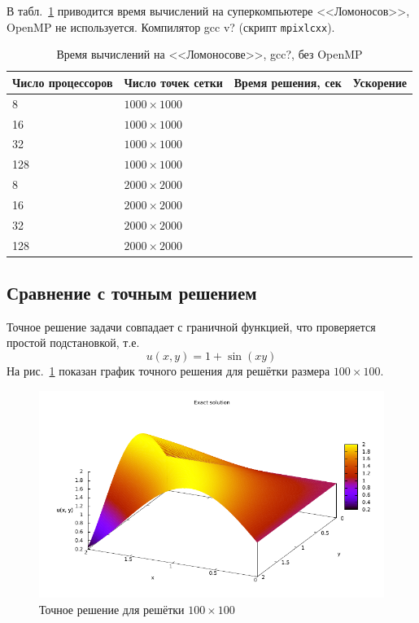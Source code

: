 \documentclass[12pt,notitlepage,oneside]{extarticle}
\begin{document}
В табл.~\ref{lom:table} приводится время вычислений на суперкомпьютере
<<Ломоносов>>, OpenMP не используется. Компилятор gcc v?
(скрипт \texttt{mpixlcxx}).

\begin{table}[h]
\centering
\caption{Время вычислений на <<Ломоносове>>, gcc?, без OpenMP}
\label{lom:table}
\begin{tabular}{|l|l|l|l|}
\textbf{Число процессоров} & \textbf{Число точек сетки} & \textbf{Время решения, сек} & \textbf{Ускорение} \\ \hline
8                          & $1000 \times 1000 $        &                        &                    \\
16                         & $1000 \times 1000 $        &                        &                    \\
32                         & $1000 \times 1000 $        &                        &                    \\
128                        & $1000 \times 1000 $        &                        &                    \\ \hline
8                          & $2000 \times 2000 $        &                        &                    \\
16                         & $2000 \times 2000 $        &                        &                    \\
32                         & $2000 \times 2000 $        &                        &                    \\
128                        & $2000 \times 2000 $        &                        &                    \\
\end{tabular}
\end{table}

\subsection{Сравнение с точным решением}
Точное решение задачи совпадает с граничной функцией, что проверяется простой
подстановкой, т.е.
\[
  u(x, y) = 1 + \sin(xy)
\]
На рис.~\ref{exact:image} показан график точного решения для решётки размера
$100 \times 100$.

\begin{figure}[h]
  \centering
  \includegraphics[scale=1.3]{correct_sol.pdf}
  \caption{Точное решение для решётки $100 \times 100$}
  \label{exact:image}
\end{figure}
\end{document}
